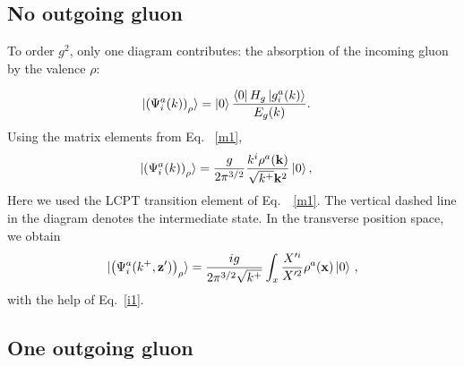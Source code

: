 \documentclass[aps,prd,amsmath,amssymb,nofootinbib]{revtex4-2}
\def\v#1{\mathbf{#1}}
\numberwithin{equation}{section}
\begin{document}
\subsection{No outgoing gluon}
To order $g^2$, only one diagram contributes: the absorption of the incoming gluon by the valence $\rho$: 
\begin{figure}[h]
\end{figure}
\begin{align}%
\ket{ \left(\Psi^{a}_{i}(k) \right)_{\rho} }   & =
   \ket{0}\frac{\bra{0}H_{g}\ket{g^a_{i}(k)}}{E_{g}(k)}.
\end{align}   
Using the matrix elements from Eq.~ \eqref{m1},
\begin{align}
  \ket{ \left(\Psi^{a}_{i}(k) \right)_{\rho} }   & =     \frac{g}{ 2\pi^{3/2}}\frac{k^i \rho^{a}(\v{k})}{\sqrt{k^+} \v{k}^{2}} \ket{0},
 \end{align}
Here we used {\color{red}the} LCPT transition element of Eq.~~\eqref{m1}. The vertical dashed line in the diagram denotes the intermediate state. In the transverse position space, we obtain
\begin{equation}
  \ket{  \left(\Psi^{a}_{i}(k^+, \v{z}') \right)_{\rho} }  = \frac{ig}{2\pi^{3/2}\sqrt{ k^+}}\int_{x}\frac{X^{\prime i}}{X^{\prime 2}} \rho^{a}(\v{x})\ket{0}\,, 
\end{equation}
with the help of Eq.~\eqref{i1}. 
\subsection{One outgoing gluon}
\end{document}

